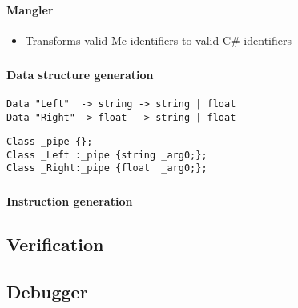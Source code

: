 \begin{frame}
    \frametitle{\subsecname}
    \framesubtitle{Mangler}
    \begin{itemize}
        \item Transforms valid Mc identifiers to valid C\# identifiers
    \end{itemize}
\end{frame}

\begin{frame}[fragile]
    \frametitle{\subsecname}
    \framesubtitle{Data structure generation}
    \begin{lstlisting}
Data "Left"  -> string -> string | float
Data "Right" -> float  -> string | float
    \end{lstlisting}
    
    \begin{lstlisting}
Class _pipe {};
Class _Left :_pipe {string _arg0;};
Class _Right:_pipe {float  _arg0;};
    \end{lstlisting}
\end{frame}

\begin{frame}
    \frametitle{\subsecname}
    \framesubtitle{Instruction generation}
\end{frame}

\subsection{Verification}
\begin{frame}
    \frametitle{\subsecname}
    \framesubtitle{}
\end{frame}

\subsection{Debugger}

\begin{frame}
    \frametitle{\subsecname}
    \framesubtitle{}
\end{frame}

